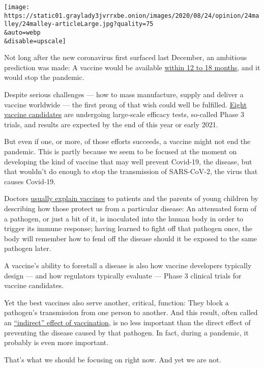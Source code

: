 \texttt{[image: https://static01.graylady3jvrrxbe.onion/images/2020/08/24/opinion/24malley/24malley-articleLarge.jpg?quality=75\\\&auto=webp\\\&disable=upscale]}

Not long after the new coronavirus first surfaced last December, an
ambitious prediction was made: A vaccine would be available
\href{https://www.sciencemag.org/news/2020/01/scientists-are-moving-record-speed-create-new-coronavirus-vaccines-they-may-come-too}{within
12 to 18 months}, and it would stop the pandemic.

Despite serious challenges --- how to mass manufacture, supply and
deliver a vaccine worldwide --- the first prong of that wish could well
be fulfilled.
\href{https://www.nytimes3xbfgragh.onion/interactive/2020/science/coronavirus-vaccine-tracker.html}{Eight
vaccine candidates} are undergoing large-scale efficacy tests, so-called
Phase 3 trials, and results are expected by the end of this year or
early 2021.

But even if one, or more, of those efforts succeeds, a vaccine might not
end the pandemic. This is partly because we seem to be focused at the
moment on developing the kind of vaccine that may well prevent Covid-19,
the disease, but that wouldn't do enough to stop the transmission of
SARS-CoV-2, the virus that causes Covid-19.

Doctors \href{https://vk.ovg.ox.ac.uk/vk/how-do-vaccines-work}{usually
explain vaccines} to patients and the parents of young children by
describing how those protect us from a particular disease: An attenuated
form of a pathogen, or just a bit of it, is inoculated into the human
body in order to trigger its immune response; having learned to fight
off that pathogen once, the body will remember how to fend off the
disease should it be exposed to the same pathogen later.

A vaccine's ability to forestall a disease is also how vaccine
developers typically design --- and how regulators typically evaluate
--- Phase 3 clinical trials for vaccine candidates.

Yet the best vaccines also serve another, critical, function: They block
a pathogen's transmission from one person to another. And this result,
often called an
\href{https://www.youtube.com/watch?v=55wOg9fe_Ms}{``indirect'' effect
of vaccination}, is no less important than the direct effect of
preventing the disease caused by that pathogen. In fact, during a
pandemic, it probably is even more important.

That's what we should be focusing on right now. And yet we are not.

